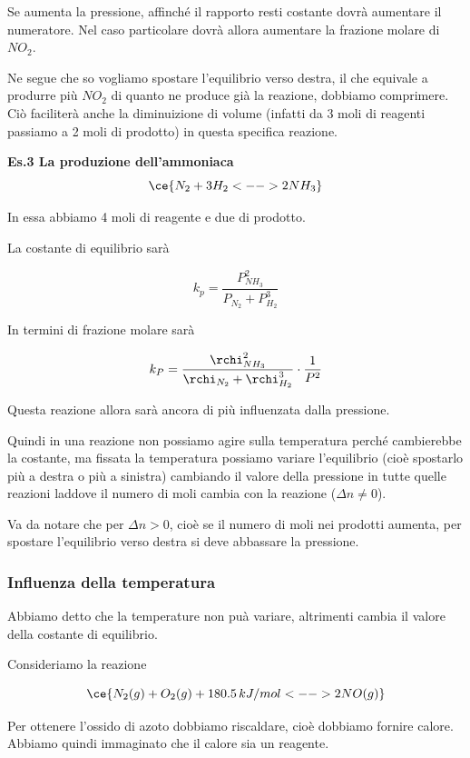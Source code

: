Se aumenta la pressione, affinché il rapporto resti costante dovrà aumentare il numeratore. Nel caso particolare dovrà allora aumentare la frazione molare di $NO_2$.

Ne segue che so vogliamo spostare l'equilibrio verso destra, il che equivale a produrre più $NO_2$ di quanto ne produce già la reazione, dobbiamo comprimere. Ciò faciliterà anche la diminuizione di volume (infatti da 3 moli di reagenti passiamo a 2 moli di prodotto) in questa specifica reazione.

\vspace{0.2cm}\textbf{Es.3 La produzione dell'ammoniaca}
$$\ce{N_2 + 3H_2 <--> 2NH_3}$$

In essa abbiamo 4 moli di reagente e due di prodotto.

La costante di equilibrio sarà

$$k_p = \frac{P_{NH_3}^2}{P_{N_2} + P_{H_2}^3}$$

In termini di frazione molare sarà

$$k_P = \frac{\rchi_{NH_3}^2}{\rchi_{N_2} + \rchi_{H_2}^3} \cdot \frac{1}{P^2}$$

Questa reazione allora sarà ancora di più influenzata dalla pressione.

\vspace{0.2cm}Quindi in una reazione non possiamo agire sulla temperatura perché cambierebbe la costante, ma fissata la temperatura possiamo variare l'equilibrio (cioè spostarlo più a destra o più a sinistra) cambiando il valore della pressione in tutte quelle reazioni laddove il numero di moli cambia con la reazione ($\Delta n \neq 0$).

\vspace{0.2cm}Va da notare che per $\Delta n > 0$, cioè se il numero di moli nei prodotti aumenta, per spostare l'equilibrio verso destra si deve abbassare la pressione.

\subsubsection{Influenza della temperatura}
Abbiamo detto che la temperature non puà variare, altrimenti cambia il valore della costante di equilibrio.

Consideriamo la reazione

$$\ce{N_2(g) + O_2(g) + 180.5 \, kJ/mol <--> 2NO(g)}$$

Per ottenere l'ossido di azoto dobbiamo riscaldare, cioè dobbiamo fornire calore. Abbiamo quindi immaginato che il calore sia un reagente.

